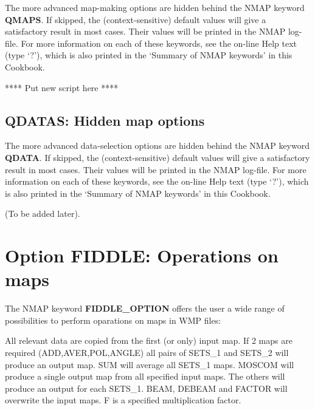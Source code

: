The more advanced map-making options are hidden behind the NMAP keyword {\bf
QMAPS}. If skipped, the (context-sensitive) default values will give a
satisfactory result in most cases.
Their values will be printed in the NMAP log-file.
For more information on each of these
keywords, see the on-line Help text (type `?'), which is also printed in the
`Summary of NMAP keywords' in this Cookbook.

**** Put new script here ****


\subsection{QDATAS: Hidden map options}
\label{.make.qdatas}

The more advanced data-selection options are hidden behind the NMAP keyword
{\bf QDATA}. If skipped, the (context-sensitive) default values will give a
satisfactory result in most cases.
Their values will be printed in the NMAP log-file.
For more information on each of these
keywords, see the on-line Help text (type `?'), which is also printed in the
`Summary of NMAP keywords' in this Cookbook.


(To be added later).


\section{Option FIDDLE: Operations on maps}
\label{.fiddle}



The NMAP keyword {\bf FIDDLE\_OPTION}
offers the user a wide range of possibilities to
perform oparations on maps in WMP files:

All relevant data are copied from the first (or only) input map.
If 2 maps are required (ADD,AVER,POL,ANGLE) all pairs of SETS\_1 and
SETS\_2 will produce an output map.
SUM will average all SETS\_1 maps.
MOSCOM will produce a single output map from all specified input maps.
The others will produce an output for each SETS\_1.
BEAM, DEBEAM and FACTOR will overwrite the input maps.
F is a specified multiplication factor.

